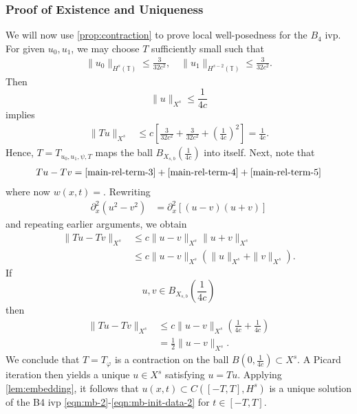 \documentclass[12pt,reqno]{amsart}
\numberwithin{equation}{section}  %
\numberwithin{figure}{section}
\newcommand{\ci}{\mathbb{T}}
\newcommand{\p}{\partial}
\newcommand{\vp}{\varphi}
\theoremstyle{plain}
\theoremstyle{definition}
\theoremstyle{remark}
\begin{document}
%
\subsubsection{Proof of Existence and Uniqueness}
\label{sssec:proof-b4-per-case}
%
%
%
%				 
%
We will now use \autoref{prop:contraction} to prove local well-posedness for the 
$B_4$ ivp. For given $u_0, u_1$, we may choose $T$ sufficiently small such
that 
%
\begin{equation*}
	\begin{split}
    \|u_0\|_{H^s(\ci)} \le \frac{3}{32c^2}, \quad \|u_1\|_{H^{s-2}(\ci)} \le \frac{3}{32c^2}.
	\end{split}
\end{equation*}
%
Then $$\|u\|_{X^{s}} \le \frac{1}{4c}$$ implies
%
\begin{equation*}
	\begin{split}
		\|Tu \|_{X^{s}} 
		& \le c \left[ \frac{3}{32c^2} + \frac{3}{32c^2}+ \left( 
		\frac{1}{4c} \right)^2 \right]
		=  \frac{1}{4c}.
	\end{split}
\end{equation*}
%
Hence, $T=T_{u_0, u_1, \psi, T}$ maps the ball $B_{X_{s,b}}(\frac{1}{4c} )$ into
itself. Next, note that 
%
\begin{equation*}
	\begin{split}
    Tu - Tv = \eqref{main-rel-term-3} + \eqref{main-rel-term-4} +
    \eqref{main-rel-term-5} 
  \end{split}
  \label{eqn:integral-form-dif}
\end{equation*}
%
where now $w(x,t) =$. Rewriting
%
\begin{equation*}
	\begin{split}
	\p_x^2 (u^2 - v^2)	
		& = \p_x^2[(u-v)(u+v)]
		\end{split}
\end{equation*}
%
and repeating earlier arguments, we obtain
%
\begin{equation}
	\label{20a}
	\begin{split}
		\|Tu - Tv \|_{X^{s}}  
		& \le c \|u -v\|_{X^{s}} \|u + v \|_{X^{s}}
		\\
		& \le c \|u -v\|_{X^{s}} (\|u\|_{X^{s}}+ \|v \|_{X^{s}}).
	\end{split}
\end{equation}
%
If $$ u, v \in B_{X_{s,b}} \left (\frac{1}{4c} \right )$$ then
%
\begin{equation}
	\label{21a}
	\begin{split}
		\|Tu - Tv \|_{X^{s}}
		& \le c \|u -v \|_{X^{s}} \left( \frac{1}{4c} + 
		\frac{1}{4c} \right)
		\\
		& = \frac{1}{2} \|u -v \|_{X^{s}}. 
	\end{split}
\end{equation}
%
We conclude that $T = T_{\vp}$ is a contraction on the ball $B(0, 
\frac{1}{4c}) \subset X^{s}$. A Picard iteration then yields a unique 
$u \in X^{s}$ satisfying $u = Tu$. Applying
\autoref{lem:embedding}, it follows that $u(x,t) \subset C( [-T, T], H^s)$ is a unique
solution of the B4 ivp \eqref{eqn:mb-2}-\eqref{eqn:mb-init-data-2} for $t
\in [-T, T]$.
%
%
\end{document}
